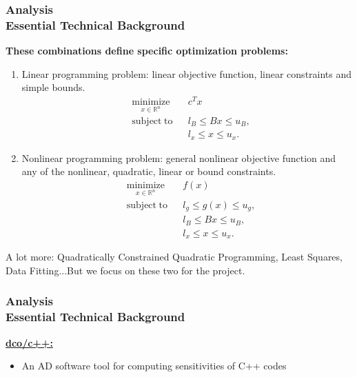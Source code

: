 \documentclass[ucs,10pt]{beamer}
\begin{document}
\begin{frame}
\frametitle{Analysis \\
\small \color{rwth-blue} Essential Technical Background}
\vspace{1ex}
\textbf{These combinations define specific optimization problems:}\\
\begin{enumerate}
\item Linear programming problem: linear objective function, linear constraints and simple bounds.
$${\displaystyle {\begin{aligned}
&{\underset{x\in \mathbb{R}^n}{\operatorname{minimize}} }&&c^Tx\\&{\operatorname{subject\; to}}&& l_B \leq Bx \leq u_B,\\&&&l_x \leq x \leq u_x.\end{aligned}}}$$ 
\item Nonlinear programming problem: general nonlinear objective function and any of the nonlinear, quadratic, linear or bound constraints.
$${\displaystyle {\begin{aligned}
&{\underset{x\in \mathbb{R}^n}{\operatorname{minimize}} }&&f(x)\\ &{\operatorname{subject\; to}}&& l_g \leq g(x) \leq u_g,\\&&&l_B \leq Bx \leq u_B,\\&&&l_x \leq x \leq u_x.\end{aligned}}}$$ 
\end{enumerate}
A lot more: Quadratically Constrained Quadratic Programming, Least Squares, Data Fitting...But we focus on these two for the project.
\end{frame}

\begin{frame}
\frametitle{Analysis \\
\small \color{rwth-blue} Essential Technical Background}
\large\underline{\textbf{dco/c++:}} 
\vspace{1em}
\begin{itemize}
	\item An AD software tool for computing sensitivities of C++ codes
\end{itemize}
\end{frame}
\end{document}
